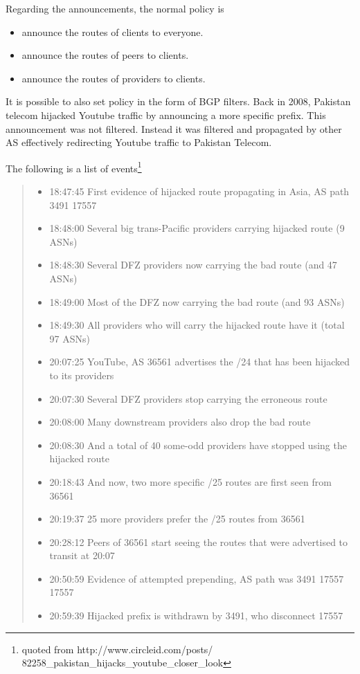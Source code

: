 Regarding the announcements, the normal policy is
\begin{itemize}
\item announce the routes of clients to everyone.
\item announce the routes of peers to clients.
\item announce the routes of providers to clients.
\end{itemize}

It is possible to also set policy in the form of BGP filters.
Back in 2008, Pakistan telecom hijacked Youtube traffic by announcing a more specific prefix.
This announcement was not filtered.
Instead it was filtered and propagated by other AS effectively redirecting Youtube traffic to Pakistan Telecom.

The following is a list of events\footnote{quoted from http://www.circleid.com/posts/ 82258\_pakistan\_hijacks\_youtube\_closer\_look}
\begin{quote}
\begin{itemize}
\item 18:47:45    First evidence of hijacked route propagating in Asia, AS path 3491 17557
\item 18:48:00    Several big trans-Pacific providers carrying hijacked route (9 ASNs)
\item 18:48:30    Several DFZ providers now carrying the bad route (and 47 ASNs)
\item 18:49:00    Most of the DFZ now carrying the bad route (and 93 ASNs)
\item 18:49:30    All providers who will carry the hijacked route have it (total 97 ASNs)
\item 20:07:25    YouTube, AS 36561 advertises the /24 that has been hijacked to its providers
\item 20:07:30    Several DFZ providers stop carrying the erroneous route
\item 20:08:00    Many downstream providers also drop the bad route
\item 20:08:30    And a total of 40 some-odd providers have stopped using the hijacked route
\item 20:18:43    And now, two more specific /25 routes are first seen from 36561
\item 20:19:37    25 more providers prefer the /25 routes from 36561
\item 20:28:12    Peers of 36561 start seeing the routes that were advertised to transit at 20:07
\item 20:50:59    Evidence of attempted prepending, AS path was 3491 17557 17557
\item 20:59:39    Hijacked prefix is withdrawn by 3491, who disconnect 17557
\end{itemize}
\end{quote}


